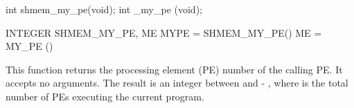 
\synC
int shmem_my_pe(void);
int _my_pe (void);

\synF 
INTEGER SHMEM_MY_PE, ME
MYPE = SHMEM_MY_PE()
ME = MY_PE ()


{
	This function returns the processing element (\ac{PE}) number of the calling
  \ac{PE}.   It accepts no arguments.	The result is an integer between  and
   - , where  is the total number of \ac{PE}s executing  the  current
  program.
}
{


	\notesB{}

}
\eAPI
